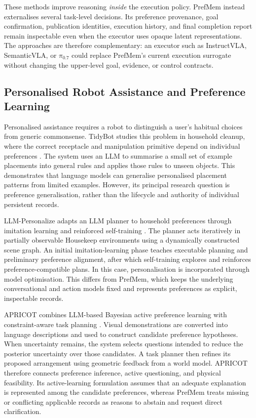 \documentclass{article}
\begin{document}
These methods improve reasoning \emph{inside} the execution policy. PrefMem
instead externalises several task-level decisions. Its preference provenance,
goal confirmation, publication identities, execution history, and final
completion report remain inspectable even when the executor uses opaque latent
representations. The approaches are therefore complementary: an executor such
as InstructVLA, SemanticVLA, or \(\pi_{0.7}\) could replace PrefMem's current
execution surrogate without changing the upper-level goal, evidence, or
control contracts.

\subsection{Personalised Robot Assistance and Preference Learning}
\label{subsec:related-personalisation}

Personalised assistance requires a robot to distinguish a user's habitual
choices from generic commonsense. TidyBot studies this problem in household
cleanup, where the correct receptacle and manipulation primitive depend on
individual preferences \parencite{wu2023tidybot}. The system uses an LLM to
summarise a small set of example placements into general rules and applies
those rules to unseen objects. This demonstrates that language models can
generalise personalised placement patterns from limited examples. However,
its principal research question is preference generalisation, rather than the
lifecycle and authority of individual persistent records.

LLM-Personalize adapts an LLM planner to household preferences through
imitation learning and reinforced self-training
\parencite{han2024llmpersonalize}. The planner acts iteratively in partially
observable Housekeep environments using a dynamically constructed scene graph.
An initial imitation-learning phase teaches executable planning and preliminary
preference alignment, after which self-training explores and reinforces
preference-compatible plans. In this case, personalisation is incorporated
through model optimisation. This differs from PrefMem, which keeps the
underlying conversational and action models fixed and represents preferences
as explicit, inspectable records.

APRICOT combines LLM-based Bayesian active preference learning with
constraint-aware task planning \parencite{wang2024apricot}. Visual
demonstrations are converted into language descriptions and used to construct
candidate preference hypotheses. When uncertainty remains, the system selects
questions intended to reduce the posterior uncertainty over those candidates.
A task planner then refines its proposed arrangement using geometric feedback
from a world model. APRICOT therefore connects preference inference, active
questioning, and physical feasibility. Its active-learning formulation assumes
that an adequate explanation is represented among the candidate preferences,
whereas PrefMem treats missing or conflicting applicable records as reasons to
abstain and request direct clarification.
\end{document}
